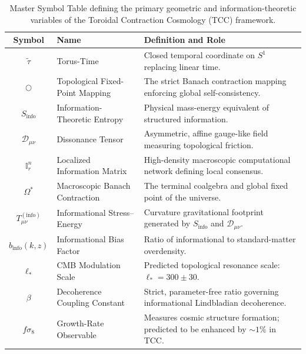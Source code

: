 \documentclass[12pt,openany]{book}
\theoremstyle{plain}
\theoremstyle{definition}
\theoremstyle{remark}
\begin{document}
\begin{minipage}{\textwidth}
\begin{table}[H]
    \centering
    \caption{Master Symbol Table defining the primary geometric and information-theoretic variables of the Toroidal Contraction Cosmology (TCC) framework.}
    \label{tab:master_symbols}
    \renewcommand{\arraystretch}{1.6}
    \begin{tabular}{|c|p{4cm}|p{8.5cm}|}
        \hline
        \textbf{Symbol} & \textbf{Name} & \textbf{Definition and Role} \\
        \hline
        $\tilde{\tau}$ & Torus-Time & Closed temporal coordinate on $S^1$ replacing linear time. \\
        \hline
        $\bigcirc$ & Topological Fixed-Point Mapping & The strict Banach contraction mapping enforcing global self-consistency. \\
        \hline
        $S_{\text{info}}$ & Information-Theoretic Entropy & Physical mass-energy equivalent of structured information. \\
        \hline
        $\mathcal{D}_{\mu\nu}$ & Dissonance Tensor & Asymmetric, affine gauge-like field measuring topological friction. \\
        \hline
        $\mathbb{I}_r^n$ & Localized Information Matrix & High-density macroscopic computational network defining local consensus. \\
        \hline
        $\Omega^*$ & Macroscopic Banach Contraction & The terminal coalgebra and global fixed point of the universe. \\
        \hline
        $T_{\mu\nu}^{(\text{info})}$ & Informational Stress--Energy & Curvature gravitational footprint generated by $S_{\text{info}}$ and $\mathcal{D}_{\mu\nu}$. \\
        \hline
        $b_{\text{info}}(k,z)$ & Informational Bias Factor & Ratio of informational to standard-matter overdensity. \\
        \hline
        $\ell_*$ & CMB Modulation Scale & Predicted topological resonance scale: $\ell_* = 300 \pm 30$. \\
        \hline
        $\beta$ & Decoherence Coupling Constant & Strict, parameter-free ratio governing informational Lindbladian decoherence. \\
        \hline
        $f\sigma_8$ & Growth-Rate Observable & Measures cosmic structure formation; predicted to be enhanced by $\sim 1\%$ in TCC. \\
        \hline
    \end{tabular}
\end{table}
\end{minipage}
\end{document}
